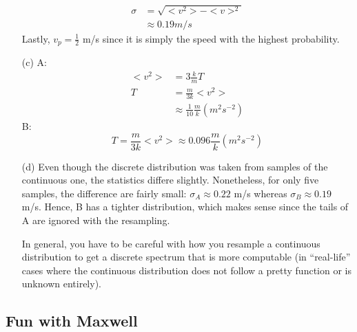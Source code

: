 \documentclass{article}
\begin{document}
\begin{itemize}
\begin{align*}
	\sigma &= \sqrt{<v^2>-<v>^2} \\
	&\approx 0.19 m/s
	\end{align*}
	Lastly, $v_p = \frac{1}{2}$ m/s since it is simply the speed with the highest probability.
	\item[(c)] A:
	\begin{align*}
	<v^2> &= 3\frac{k}{m}T \\
	T &= \frac{m}{3k}<v^2> \\
	&\approx \frac{1}{10}\frac{m}{k} (m^2 s^{-2})
	\end{align*}
	B:
	\begin{equation}
	T = \frac{m}{3k}<v^2> \approx 0.096\frac{m}{k} (m^2 s^{-2})
	\end{equation}
	\item[(d)] Even though the discrete distribution was taken from samples of the continuous one, the statistics differe slightly. Nonetheless, for only five samples, the difference are fairly small: $\sigma_A\approx0.22$ m/s whereas $\sigma_B\approx0.19$ m/s. Hence, B has a tighter distribution, which makes sense since the tails of A are ignored with the resampling.
	
	In general, you have to be careful with how you resample a continuous distribution to get a discrete spectrum that is more computable (in ``real-life'' cases where the continuous distribution does not follow a pretty function or is unknown entirely).
\end{itemize}

\subsection{Fun with Maxwell}
\end{document}
